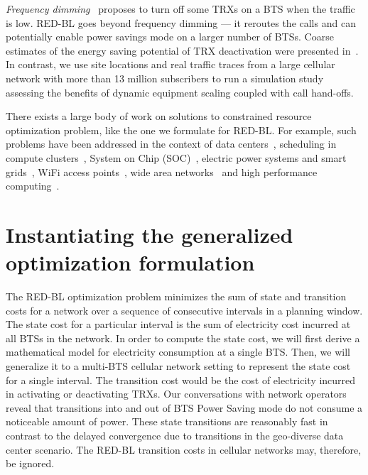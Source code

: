 \textit{Frequency dimming}~\cite{Tipper:Dimming:Globecom:2010} proposes to turn off some TRXs on a BTS when the traffic is low. RED-BL goes beyond frequency dimming --- it reroutes the calls and can potentially enable power savings mode on a larger number of BTSs.
Coarse estimates of the energy saving potential of TRX deactivation were presented
in~\cite{Blume:2010:BLTJ:CellularPower}.
In contrast, we use site locations and real traffic traces from a large cellular network with more than 13 million subscribers to run a simulation study assessing the benefits of dynamic equipment scaling coupled
with call hand-offs.

There exists a large body of work on solutions to constrained resource optimization problem, like the one we formulate for RED-BL. For example, such problems have been addressed in the context of data centers~\cite{Jeyarani:2012:DIA:2148243.2148374,serverEnergy,Mazzucco:Maximizing:2011:CoRR,Oh:2011:ECS:2170444.2170458,Chase:2001:MES:502059.502045}, scheduling in compute clusters~\cite{AlDaoud2012745}, System on Chip (SOC)~\cite{Fang:2011:COP:1995896.1995940}, electric power systems and smart grids~\cite{Javed:2008:ULP:1485753.1485792,Logenthiran2011138,Celli:2001:PICA,FahadJavedAdOpt.SASO.2009.26}, WiFi access points~\cite{Marsan:2010:SAM:1791314.1791340}, wide area networks~\cite{Cavdar:2011:ECOC} and high performance computing~\cite{Lee:ServerConsolidation:2011:Globecom,Pinheiro01loadbalancing,Yao:DCPowerReduction:2012:INFOCOM,Herodotou:Starfish:2011:CIDR,Herodotou:2011:NOS:2038916.2038934,Aikema:ElecCostHPC:2011:ISSST}.




\section{Instantiating the generalized optimization formulation} %
\label{sec:case2:instantiate}
The RED-BL optimization problem minimizes the sum of state and transition costs for a network over a sequence of consecutive intervals in a planning window. The state cost for a particular interval is the sum of electricity cost incurred at all BTSs in the network. In order to compute the state cost, we will first derive a mathematical model for electricity consumption at a single BTS. Then, we will generalize it to a multi-BTS cellular network setting to represent the state cost for a single interval. The transition cost would be the cost of electricity incurred in activating or deactivating TRXs. Our conversations with network operators reveal that transitions into and out of BTS Power Saving mode do not consume a noticeable amount of power. These state transitions are reasonably fast in contrast to the delayed convergence due to transitions in the geo-diverse data center scenario. The RED-BL transition costs in cellular networks may, therefore, be ignored.

